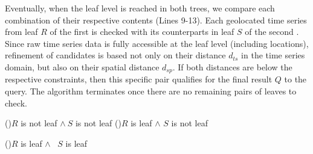 
Eventually, when the leaf level is reached in both trees, we compare each combination of their respective contents (Lines 9-13). Each geolocated time series from leaf $R$ of the first \isax is checked with its counterparts in leaf $S$ of the second \isax. Since raw time series data is fully accessible at the leaf level (including locations), refinement of candidates is based not only on their distance $d_{ts}$ in the time series domain, but also on their spatial distance $d_{sp}$. If both distances are below the respective constraints, then this specific pair qualifies for the final result $Q$ to the query. The algorithm terminates once there are no remaining pairs of leaves to check.


\begin{algorithm}[!ht]
\begin{small}
	\DontPrintSemicolon
	\BlankLine
	\If(){$R$ is not leaf $\land \ S$ is not leaf}{
	}
	\ElseIf(){$R$ is leaf $\land$ $S$ is not leaf}{
	}

	\ElseIf(){$R$ is leaf $\land$ \  $S$ is leaf}{
	}
	\caption{$SimJoinSAX(R, S, \epsilon_{sp}, \epsilon_{ts})$}
	\label{alg:sim_joins_isax}
\end{small}		
\end{algorithm}





